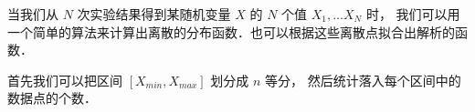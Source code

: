 
当我们从 $N$ 次实验结果得到某随机变量 $X$ 的 $N$ 个值 $X_1,\dots X_N$ 时， 我们可以用一个简单的算法来计算出离散的分布函数．也可以根据这些离散点拟合出解析的函数．

首先我们可以把区间 $[X_{min}, X_{max}]$ 划分成 $n$ 等分， 然后统计落入每个区间中的数据点的个数．